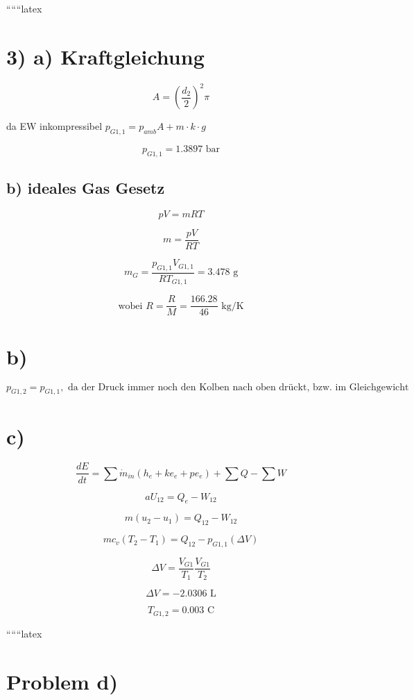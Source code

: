 
``````latex


\section*{3) a) Kraftgleichung}

\[
A = \left( \frac{d_2}{2} \right)^2 \pi
\]

da EW inkompressibel \( p_{G1,1} = p_{amb} A + m \cdot k \cdot g \)

\[
\boxed{p_{G1,1} = 1.3897 \text{ bar}}
\]

\subsection*{b) ideales Gas Gesetz}

\[
pV = mRT
\]

\[
\boxed{m = \frac{pV}{RT}}
\]

\[
\boxed{m_{G} = \frac{p_{G1,1} V_{G1,1}}{R T_{G1,1}} = 3.478 \text{ g}}
\]

\[
\text{wobei } R = \frac{R}{M} = \frac{166.28}{46} \text{ kg/K}
\]

\section*{b)}

\[
p_{G1,2} = p_{G1,1}, \text{ da der Druck immer noch den Kolben nach oben drückt, bzw. im Gleichgewicht ist}
\]

\section*{c)}

\[
\frac{dE}{dt} = \sum \dot{m}_{in} (h_{e} + ke_{e} + pe_{e}) + \sum Q - \sum W
\]

\[
aU_{12} = Q_{e} - W_{12}
\]

\[
m (u_{2} - u_{1}) = Q_{12} - W_{12}
\]

\[
mc_{v} (T_{2} - T_{1}) = Q_{12} - p_{G1,1} (\Delta V)
\]

\[
\Delta V = \frac{V_{G1}}{T_{1}} \frac{V_{G1}}{T_{2}}
\]

\[
\boxed{\Delta V = -2.0306 \text{ L}}
\]

\[
\boxed{T_{G1,2} = 0.003 \text{ C}}
\]

``````latex


\section*{Problem d)}

